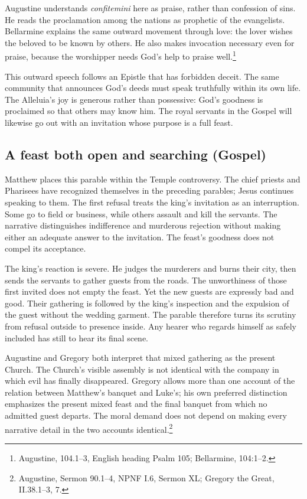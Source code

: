Augustine understands \textit{confitemini} here as praise, rather than
confession of sins. He reads the proclamation among the nations as
prophetic of the evangelists. Bellarmine explains the same outward
movement through love: the lover wishes the beloved to be known by
others. He also makes invocation necessary even for praise, because the
worshipper needs God's help to praise well.\footnote{Augustine,
 104.1--3, English heading Psalm 105; Bellarmine,
 104:1--2.}

This outward speech follows an Epistle that has forbidden deceit.
The same community that announces God's deeds must speak truthfully
within its own life. The Alleluia's joy is generous rather than
possessive: God's goodness is proclaimed so that others may know him.
The royal servants in the Gospel will likewise go out with an invitation
whose purpose is a full feast.

\subsection{A feast both open and searching (Gospel)}

Matthew places this parable within the Temple controversy. The chief
priests and Pharisees have recognized themselves in the preceding
parables; Jesus continues speaking to them. The first refusal treats the
king's invitation as an interruption. Some go to field or business, while
others assault and kill the servants. The narrative distinguishes
indifference and murderous rejection without making either an adequate
answer to the invitation. The feast's goodness does not compel its
acceptance.

The king's reaction is severe. He judges the murderers and burns their
city, then sends the servants to gather guests from the roads. The
unworthiness of those first invited does not empty the feast. Yet the
new guests are expressly bad and good. Their gathering is followed by
the king's inspection and the expulsion of the guest without the wedding
garment. The parable therefore turns its scrutiny from refusal outside
to presence inside. Any hearer who regards himself as safely included
has still to hear its final scene.

Augustine and Gregory both interpret that mixed gathering as the present
Church. The Church's visible assembly is not identical with the company
in which evil has finally disappeared. Gregory allows more than one
account of the relation between Matthew's banquet and Luke's; his own
preferred distinction emphasizes the present mixed feast and the final
banquet from which no admitted guest departs. The moral demand does
not depend on making every narrative detail in the two accounts
identical.\footnote{Augustine, Sermon 90.1--4, NPNF I.6, Sermon XL;
Gregory the Great,  II.38.1--3, 7.}

